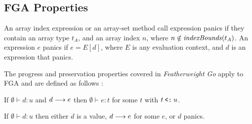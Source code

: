 \subsection{FGA Properties}

An array index expression or an array-set method call expression panics if they
contain an array type $t_A$, and an array index $n$, where $n \notin
    \mathit{indexBounds}(t_A)$. An expression $e$ panics if $e = E[d]$, where $E$ is any
evaluation context, and $d$ is an expression that panics.

The progress and preservation properties covered in \emph{Featherweight Go}
apply to FGA and are defined as follows \autocite{fg}:

\begin{theorem}[Preservation]
    If\/ $\emptyset \vdash d : u$ and $d \longrightarrow e$
    then\/ $\emptyset \vdash e : t$ for some $t$
    with\/ $t \mathbin{\texttt{<:}} u$.
\end{theorem}

\begin{theorem}[Progress]
    If\/ $\emptyset \vdash d:u$ then
    either\/ $d$ is a value,
    $d \longrightarrow e$ for some $e$,
    or\/ $d$ panics.
\end{theorem}

